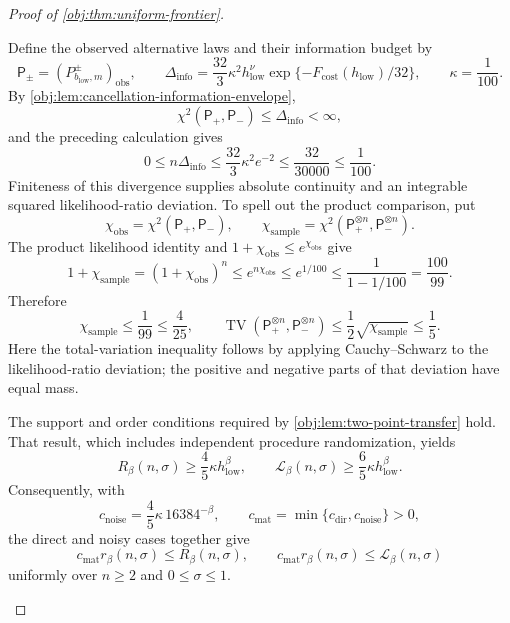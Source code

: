 \begin{proof}[Proof of \cref{obj:thm:uniform-frontier}]
\begin{enumerate}
Define the observed alternative laws and their information budget by
\[
\mathsf P_\pm=(P^\pm_{b_{\mathrm{low}},m})_{\mathrm{obs}},
\qquad
\Delta_{\mathrm{info}}
=\frac{32}{3}\kappa^2h_{\mathrm{low}}^\nu
 \exp\{-F_{\mathrm{cost}}(h_{\mathrm{low}})/32\},
\qquad
\kappa=\frac1{100}.
\]
By \cref{obj:lem:cancellation-information-envelope},
\[
\chi^2(\mathsf P_+,\mathsf P_-)\le\Delta_{\mathrm{info}}<\infty,
\]
and the preceding calculation gives
\[
0\le n\Delta_{\mathrm{info}}
\le\frac{32}{3}\kappa^2e^{-2}
\le\frac{32}{30000}
\le\frac1{100}.
\]
Finiteness of this divergence supplies absolute continuity and an integrable
squared likelihood-ratio deviation. To spell out the product comparison, put
\[
\chi_{\mathrm{obs}}=\chi^2(\mathsf P_+,\mathsf P_-),
\qquad
\chi_{\mathrm{sample}}
=\chi^2(\mathsf P_+^{\otimes n},\mathsf P_-^{\otimes n}).
\]
The product likelihood identity and \(1+\chi_{\mathrm{obs}}\le e^{\chi_{\mathrm{obs}}}\) give
\[
1+\chi_{\mathrm{sample}}
=(1+\chi_{\mathrm{obs}})^n
\le e^{n\chi_{\mathrm{obs}}}
\le e^{1/100}
\le\frac1{1-1/100}
=\frac{100}{99}.
\]
Therefore
\[
\chi_{\mathrm{sample}}\le\frac1{99}\le\frac4{25},
\qquad
\operatorname{TV}(\mathsf P_+^{\otimes n},\mathsf P_-^{\otimes n})
\le\frac12\sqrt{\chi_{\mathrm{sample}}}
\le\frac15.
\]
Here the total-variation inequality follows by applying Cauchy--Schwarz to
the likelihood-ratio deviation; the positive and negative parts of that
deviation have equal mass.

The support and order conditions required by
\cref{obj:lem:two-point-transfer} hold. That result, which includes independent
procedure randomization, yields
\[
R_\beta(n,\sigma)\ge\frac45\kappa h_{\mathrm{low}}^\beta,
\qquad
\mathcal L_\beta(n,\sigma)\ge\frac65\kappa h_{\mathrm{low}}^\beta.
\]
Consequently, with
\[
c_{\mathrm{noise}}=\frac45\kappa\,16384^{-\beta},
\qquad
c_{\mathrm{mat}}=\min\{c_{\mathrm{dir}},c_{\mathrm{noise}}\}>0,
\]
the direct and noisy cases together give
\[
c_{\mathrm{mat}}r_\beta(n,\sigma)\le R_\beta(n,\sigma),
\qquad
c_{\mathrm{mat}}r_\beta(n,\sigma)\le\mathcal L_\beta(n,\sigma)
\]
uniformly over \(n\ge2\) and \(0\le\sigma\le1\).


\end{enumerate}
\end{proof}
